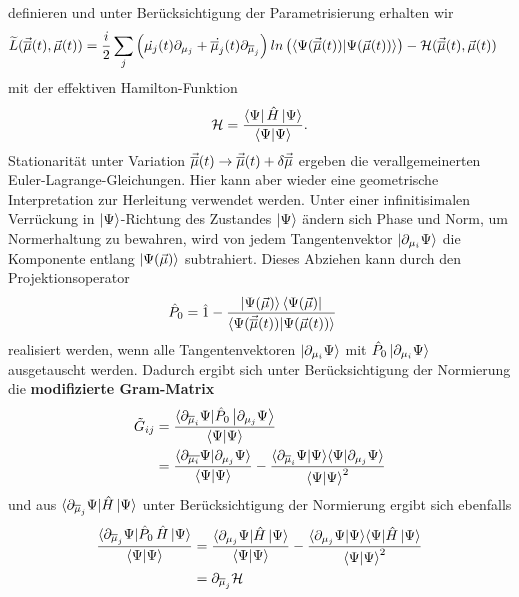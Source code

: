 definieren und unter Berücksichtigung der Parametrisierung erhalten wir
\begin{align}
        \widetilde{L}(\vec{\overline{\mu}}(t),\vec{\mu}(t)) &= \frac{i}{2}\sum_j\left(\dot{\mu_j}(t)\partial_{\mu_j} + \dot{\overline{\mu}_j}(t)\partial_{\overline{\mu}_j}\right)
        ln\left(\langle\Psi(\vec{\overline{\mu}}(t))|\Psi(\vec{\mu}(t))\rangle\right) - \mathcal{H}(\vec{\overline{\mu}}(t),\vec{\mu}(t))
\end{align}
mit der effektiven Hamilton-Funktion
\begin{align}
    \mathcal{H} = \frac{\bra{\Psi}\hat{H}\ket{\Psi}}{\bra{\Psi}\ket{\Psi}}.
\end{align}
Stationarität unter Variation $\vec{\overline{\mu}}(t)\rightarrow \vec{\overline{\mu}}(t) + \delta\vec{\overline{\mu}}$ ergeben die 
verallgemeinerten Euler-Lagrange-Gleichungen. Hier kann aber wieder eine geometrische Interpretation zur Herleitung verwendet werden. Unter einer 
infinitisimalen Verrückung in $\ket{\Psi}$-Richtung des Zustandes $\ket{\Psi}$ ändern sich Phase und Norm, um Normerhaltung zu bewahren, wird von jedem 
Tangentenvektor $\ket{\partial_{\mu_i}\Psi}$ die Komponente entlang $\ket{\Psi(\vec{\mu})}$ subtrahiert. Dieses Abziehen kann durch den 
Projektionsoperator 
\begin{align}
    \hat{P}_0 &= \hat{1} - \frac{\ket{\Psi(\vec{\mu})}\bra{\Psi(\vec{\mu})}}{\langle\Psi(\vec{\overline{\mu}}(t))|\Psi(\vec{\mu}(t))\rangle}
\end{align}
realisiert werden, wenn alle Tangentenvektoren $\ket{\partial_{\mu_i}\Psi}$ mit $\hat{P}_0\ket{\partial_{\mu_i}\Psi}$ ausgetauscht werden.
Dadurch ergibt sich unter Berücksichtigung der Normierung die \textbf{modifizierte Gram-Matrix}
\begin{align}
    \tilde{G}_{ij} &= \frac{\langle\partial_{\overline{\mu}_i}\Psi|\hat{P}_0\ket{\partial_{\mu_j}\Psi}}{\bra{\Psi}\ket{\Psi}}  \nonumber \\
    &= \frac{\langle\partial_{\overline{\mu_i}}\Psi|\partial_{\mu_j}\Psi\rangle}{\bra{\Psi}\ket{\Psi}}
    - \frac{\langle\partial_{\overline{\mu}_i}\Psi|\Psi\rangle\langle\Psi|\partial_{\mu_j}\Psi\rangle}{\bra{\Psi}\ket{\Psi}^2}
\end{align}
und aus $ \langle\partial_{\overline{\mu}_j}\Psi|\hat{H}\ket{\Psi}$ unter Berücksichtigung der Normierung ergibt sich ebenfalls
\begin{align}
    \frac{\langle\partial_{\overline{\mu}_j}\Psi|\hat{P}_0\thinspace\hat{H}\ket{\Psi}}{\langle\Psi|\Psi\rangle}    
                &= \frac{\langle\partial_{\mu_j}\Psi|\hat{H}\ket{\Psi}}{\bra{\Psi}\ket{\Psi}} 
                - \frac{\langle\partial_{\mu_j}\Psi|\Psi\rangle\langle\Psi|\hat{H}\ket{\Psi}}{\bra{\Psi}\ket{\Psi}^2} \nonumber \\
                &= \partial_{\overline{\mu}_j}\mathcal{H}                
\end{align}

